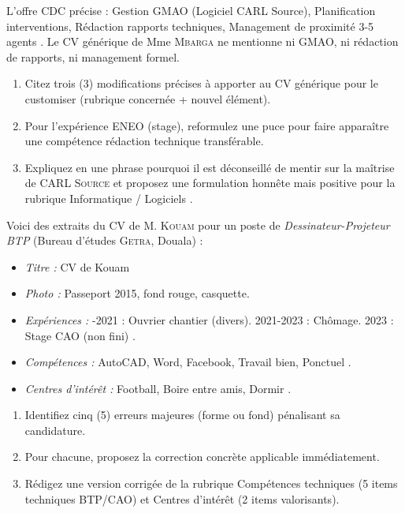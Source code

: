 \documentclass[11pt]{article}
\begin{document}
\begin{exercice}
L'offre \textsc{CDC} précise : \og Gestion GMAO (Logiciel CARL Source), Planification interventions, Rédaction rapports techniques, Management de proximité 3-5 agents \fg{}. Le CV générique de Mme \textsc{Mbarga} ne mentionne ni GMAO, ni rédaction de rapports, ni management formel.
\begin{enumerate}
    \item Citez trois (3) modifications précises à apporter au CV générique pour le \og customiser \fg{} (rubrique concernée + nouvel élément).
    \item Pour l'expérience \textsc{ENEO} (stage), reformulez une puce pour faire apparaître une compétence \og rédaction technique \fg{} transférable.
    \item Expliquez en une phrase pourquoi il est déconseillé de mentir sur la maîtrise de \textsc{CARL Source} et proposez une formulation honnête mais positive pour la rubrique \og Informatique / Logiciels \fg{}.
\end{enumerate}
\end{exercice}

\begin{exercice}
Voici des extraits du CV de M. \textsc{Kouam} pour un poste de \textit{Dessinateur-Projeteur BTP} (Bureau d'études \textsc{Getra}, Douala) :
\begin{itemize}
    \item \textit{Titre :} \og CV de Kouam \fg{}
    \item \textit{Photo :} Passeport 2015, fond rouge, casquette.
    \item \textit{Expériences :} -2021 : Ouvrier chantier (divers). 2021-2023 : Chômage. 2023 : Stage CAO (non fini) \fg{}.
    \item \textit{Compétences :} \og AutoCAD, Word, Facebook, Travail bien, Ponctuel \fg{}.
    \item \textit{Centres d'intérêt :} \og Football, Boire entre amis, Dormir \fg{}.
\end{itemize}
\begin{enumerate}
    \item Identifiez cinq (5) erreurs majeures (forme ou fond) pénalisant sa candidature.
    \item Pour chacune, proposez la correction concrète applicable immédiatement.
    \item Rédigez une version corrigée de la rubrique \og Compétences techniques \fg{} (5 items techniques BTP/CAO) et \og Centres d'intérêt \fg{} (2 items valorisants).
\end{enumerate}
\end{exercice}
\end{document}
